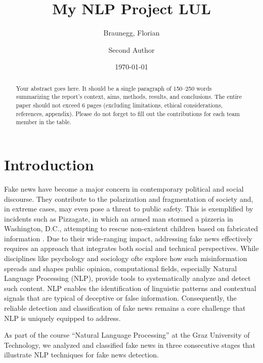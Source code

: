 \documentclass[12pt,a4paper,twocolumn]{article}
\title{My NLP Project LUL} %
\author[1]{Braunegg, Florian} %
\author[2]{Second Author}
\affil[1]{Graz University of Technology, Graz, Austria}
\affil[2]{University of Graz, Graz, Austria}
\date{\today}
\begin{document}
\maketitle


\begin{abstract}
    Your abstract goes here. It should be a single paragraph of 150--250 words summarizing the report’s context, aims, methods, results, and conclusions.
    The entire paper should not exceed 6 pages (excluding limitations, ethical considerations, references, appendix).
    Please do not forget to fill out the contributions for each team member in the table.
\end{abstract}

\section{Introduction}
\label{sec:intro}
Fake news have become a major concern in contemporary political and social discourse. They contribute to the polarization and fragmentation of society \citep{au2022role} and, in extreme cases, may even pose a threat to public safety. This is exemplified by incidents such as Pizzagate, in which an armed man stormed a pizzeria in Washington, D.C., attempting to rescue non-existent children based on fabricated information \citep{2016pizzagate}. Due to their wide-ranging impact, addressing fake news effectively requires an approach that integrates both social and technical perspectives. While disciplines like psychology and sociology ofte explore how such misinformation spreads and shapes public opinion, computational fields, especially Natural Language Processing (NLP), provide tools to systematically analyze and detect such content. NLP enables the identification of linguistic patterns and contextual signals that are typical of deceptive or false information. Consequently, the reliable detection and classification of fake news remains a core challenge that NLP is uniquely equipped to address.

As part of the course ``Natural Language Processing'' at the Graz University of Technology, we analyzed and classified fake news in three consecutive stages that illustrate NLP techniques for fake news detection.
\end{document}
